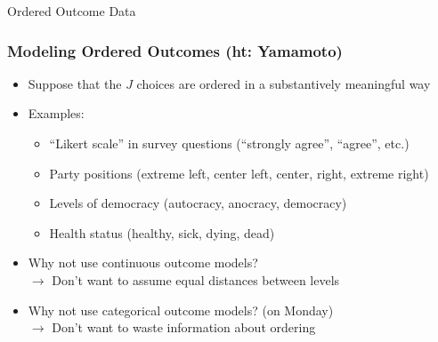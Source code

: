 \documentclass{beamer}
\begin{document}
\begin{frame}

\huge 
Ordered Outcome Data

\end{frame}



\begin{frame}
\frametitle{Modeling Ordered Outcomes (ht: Yamamoto)}
\begin{itemize}
    \item Suppose that the $J$ choices are \alert{ordered} in a substantively meaningful way
\pause
    \item Examples:
        \begin{itemize}
            \item ``Likert scale'' in survey questions (``strongly agree'', ``agree'', etc.)
            \item Party positions (extreme left, center left, center, right, extreme right)
            \item Levels of democracy (autocracy, anocracy, democracy)
            \item Health status (healthy, sick, dying, dead)
        \end{itemize}
    \medskip
\pause
    \item Why not use continuous outcome models? \\
\pause
        $\longrightarrow$ Don't want to assume equal distances between levels
\pause
    \item Why not use categorical outcome models? (on Monday) \\
\pause
        $\longrightarrow$ Don't want to waste information about ordering

\end{itemize}

\end{frame}
\end{document}
